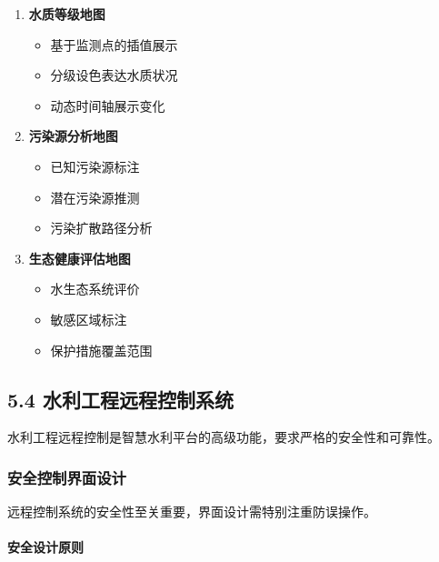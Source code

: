 \begin{enumerate}
\def\labelenumi{\arabic{enumi}.}
\tightlist
\item
  \textbf{水质等级地图}

  \begin{itemize}
  \tightlist
  \item
    基于监测点的插值展示
  \item
    分级设色表达水质状况
  \item
    动态时间轴展示变化
  \end{itemize}
\item
  \textbf{污染源分析地图}

  \begin{itemize}
  \tightlist
  \item
    已知污染源标注
  \item
    潜在污染源推测
  \item
    污染扩散路径分析
  \end{itemize}
\item
  \textbf{生态健康评估地图}

  \begin{itemize}
  \tightlist
  \item
    水生态系统评价
  \item
    敏感区域标注
  \item
    保护措施覆盖范围
  \end{itemize}
\end{enumerate}

\subsection{5.4
水利工程远程控制系统}\label{ux6c34ux5229ux5de5ux7a0bux8fdcux7a0bux63a7ux5236ux7cfbux7edf}

水利工程远程控制是智慧水利平台的高级功能，要求严格的安全性和可靠性。

\subsubsection{安全控制界面设计}\label{ux5b89ux5168ux63a7ux5236ux754cux9762ux8bbeux8ba1}

远程控制系统的安全性至关重要，界面设计需特别注重防误操作。

\paragraph{安全设计原则}\label{ux5b89ux5168ux8bbeux8ba1ux539fux5219}

